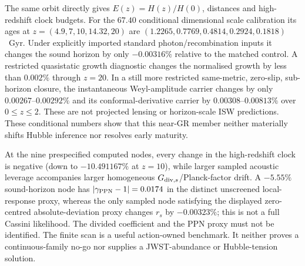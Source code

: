 \documentclass[11pt,a4paper]{article}
\begin{document}
The same orbit directly gives $E(z)=H(z)/H(0)$, distances and high-redshift
clock budgets.  For the $67.40$ conditional dimensional scale calibration its ages at
$z=(4.9,7,10,14.32,20)$ are
$(1.2265,0.7769,0.4814,0.2924,0.1818)$~Gyr.  Under explicitly imported
standard photon/recombination inputs it changes the sound horizon by only
$-0.00316\%$ relative to the matched control.  A restricted quasistatic
growth diagnostic changes the normalised growth by less than
$0.002\%$ through $z=20$.  In a still more restricted same-metric,
zero-slip, sub-horizon closure, the instantaneous Weyl-amplitude carrier
changes by only $0.00267$--$0.00292\%$ and its conformal-derivative carrier
by $0.00308$--$0.00813\%$ over $0\le z\le2$.  These are not projected
lensing or horizon-scale ISW predictions.  These conditional numbers show that this
near-GR member neither materially shifts Hubble inference nor resolves early
maturity.

At the nine prespecified computed nodes, every change in the
high-redshift clock is negative (down to $-10.491167\%$ at $z=10$), while
larger sampled acoustic leverage accompanies larger homogeneous
$G_{{\rm div},s}$/Planck-factor drift.  A $-5.55\%$ sound-horizon node has
$|\gamma_{\rm PPN}-1|=0.0174$ in the distinct unscreened local-response proxy,
whereas the only sampled node satisfying the displayed zero-centred
absolute-deviation proxy changes $r_s$ by $-0.00323\%$; this is not a full
Cassini likelihood.  The divided coefficient and the PPN proxy must not be
identified.  The finite scan is a useful action-owned benchmark.  It neither
proves a continuous-family no-go nor supplies a JWST-abundance or
Hubble-tension solution.
\end{document}
